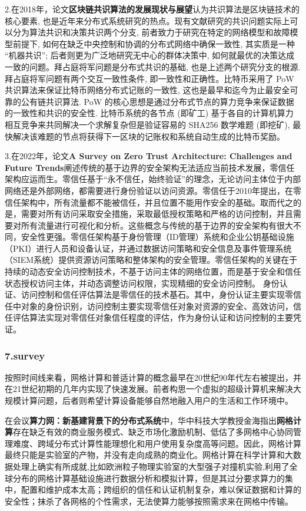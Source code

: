 \documentclass[a4paper,twoside]{scrbook}
\begin{document}
2.在2018年，论文\textbf{区块链共识算法的发展现状与展望}认为共识算法是区块链技术的核心要素, 也是近年来分布式系统研究的热点。现有文献研究的共识问题实际上可以分为算法共识和决策共识两个分支, 前者致力于研究在特定的网络模型和故障模型前提下, 如何在缺乏中央控制和协调的分布式网络中确保一致性, 其实质是一种 “机器共识”; 后者则更为广泛地研究无中心的群体决策中, 如何就最优的决策达成一致的问题。拜占庭将军问题是分布式共识的基础, 也是上述两个研究分支的根源. 拜占庭将军问题有两个交互一致性条件, 即一致性和正确性。比特币采用了 PoW 共识算法来保证比特币网络分布式记账的一致性, 这也是最早和迄今为止最安全可靠的公有链共识算法. PoW 的核心思想是通过分布式节点的算力竞争来保证数据的一致性和共识的安全性. 比特币系统的各节点 (即矿工) 基于各自的计算机算力相互竞争来共同解决一个求解复杂但是验证容易的 SHA256 数学难题 (即挖矿), 最快解决该难题的节点将获得下一区块的记账权和系统自动生成的比特币奖励。

3.在2022年，论文\textbf{A Survey on Zero Trust Architecture: Challenges and Future Trends}阐述传统的基于边界的安全架构无法适应当前技术发展，零信任架构应运而生。零信任基于“永不信任，始终验证”的理念，无论访问主体位于内部网络还是外部网络，都需要进行身份验证以访问资源。零信任于2010年提出，在零信任架构中，所有流量都不能被信任，并且位置不能用作安全的基础。取而代之的是，需要对所有访问采取安全措施，采取最低授权策略和严格的访问控制，并且需要对所有流量进行可视化和分析。这些概念与传统的基于边界的安全架构有很大不同，安全性更强。零信任架构基于身份管理（ID管理）系统和企业公钥基础设施（PKI）进行人员和设备认证，并通过数据访问策略和安全信息及事件管理系统（SIEM系统）提供资源访问策略和整体架构的安全管理。零信任架构的关键在于持续的动态安全访问控制技术，不基于访问主体的网络位置，而是基于安全和信任状态授权访问主体，并动态调整访问权限，实现精细的安全访问控制。
身份认证、访问控制和信任评估算法是零信任的技术基石。其中，身份认证主要实现零信任中对象的身份识别，访问控制主要实现零信任对象对资源的安全、高效访问，信任评估算法实现对零信任对象信任程度的评估，作为身份认证和访问控制的主要凭证。
\subsubsection{7.survey}
按照时间线来看，网格计算和普适计算的概念最早在20世纪90年代左右被提出，并在21世纪初期的几年内实现了快速发展。前者构思一个虚拟的超级计算机来解决大规模计算问题，后者则希望计算设备能够自然地融入用户的生活和工作环境中。

在会议\textbf{算力网：新基建背景下的分布式系统}中，华中科技大学教授金海指出\textbf{网格计算}存在缺乏有效的商业服务模式、缺乏市场化激励机制、低估了多网格中心协同管理难度、跨域分布式计算性能理想化和用户使用复杂度高等问题。因此，网格计算最终只能是实验室的产物，并没有走向成熟的商业化。网格计算在科学计算和大数据处理上确实有所成就,比如欧洲粒子物理实验室的大型强子对撞机实验,利用了全球分布的网格计算基础设施进行数据分析和模拟计算，但是其过分要求算力的集中，配置和维护成本太高；跨组织的信任和认证机制复杂，难以保证数据和计算的安全性；抹杀了各网格的个性需求，无法使算力能够按照需求来在网格中传输。
\end{document}
